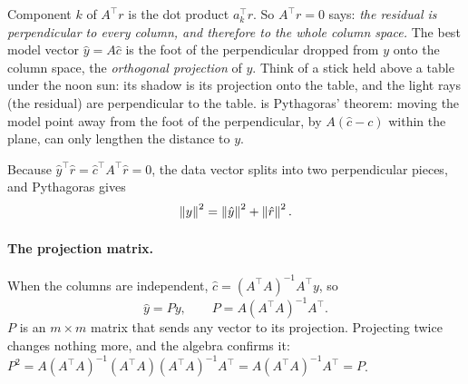 Component $k$ of $A^\top r$ is the dot product $a_k^\top r$. So $A^\top r = 0$ says: \emph{the residual is perpendicular to every column, and therefore to the whole column space.} The best model vector $\hat y = A\hat c$ is the foot of the perpendicular dropped from $y$ onto the column space, the \emph{orthogonal projection} of $y$. Think of a stick held above a table under the noon sun: its shadow is its projection onto the table, and the light rays (the residual) are perpendicular to the table.  is Pythagoras' theorem: moving the model point away from the foot of the perpendicular, by $A(\hat c - c)$ within the plane, can only lengthen the distance to $y$.

Because $\hat y^\top \hat r = \hat c^\top A^\top \hat r = 0$, the data vector splits into two perpendicular pieces, and Pythagoras gives
\begin{equation}
\left\lVert y\right\rVert^2 = \left\lVert \hat y\right\rVert^2 + \left\lVert \hat r\right\rVert^2 .
\label{eq:least-squares-pythagoras}
\end{equation}

\paragraph{The projection matrix.} When the columns are independent, $\hat c = (A^\top A)^{-1}A^\top y$, so
\begin{equation}
\hat y = P y,\qquad P = A(A^\top A)^{-1}A^\top .
\label{eq:least-squares-P}
\end{equation}
$P$ is an $m\times m$ matrix that sends any vector to its projection. Projecting twice changes nothing more, and the algebra confirms it: $P^2 = A(A^\top A)^{-1}(A^\top A)(A^\top A)^{-1}A^\top = A(A^\top A)^{-1}A^\top = P$.

